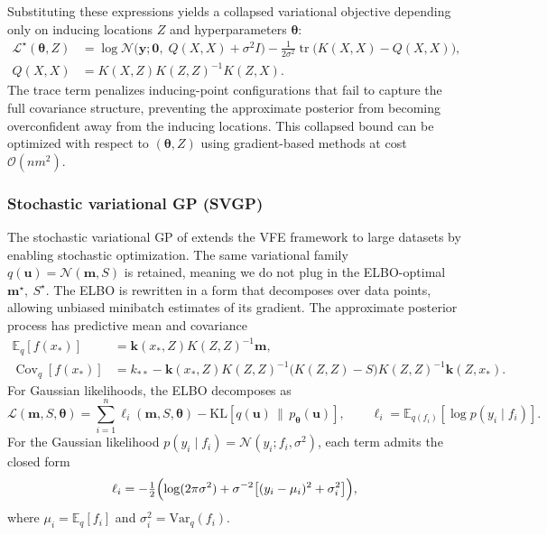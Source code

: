 \documentclass[11pt,a4paper]{article}
\newcommand{\bmm}{\boldsymbol{m}}
\newcommand{\by}{\boldsymbol{y}}
\newcommand{\btheta}{\boldsymbol{\theta}}
\begin{document}
Substituting these expressions yields a collapsed variational objective depending only on inducing locations $Z$ and
hyperparameters $\btheta$:
\begin{equation}
\begin{aligned}
\mathcal{L}^\star(\btheta,Z)
&=\log\mathcal{N}\!\bigl(\by;\bm 0,\;Q(X,X)+\sigma^2 I\bigr)
-\frac{1}{2\sigma^2}\operatorname{tr}\!\bigl(K(X,X)-Q(X,X)\bigr),\\
Q(X,X)&=K(X,Z)K(Z,Z)^{-1}K(Z,X).
\end{aligned}
\label{eq:SVGP elbo}
\end{equation}
The trace term penalizes inducing-point configurations that fail to capture the full covariance structure, preventing the
approximate posterior from becoming overconfident away from the inducing locations.
This collapsed bound can be optimized with respect to $(\btheta,Z)$ using gradient-based methods at cost $\mathcal{O}(nm^2)$.

\subsubsection{Stochastic variational GP (SVGP)}
The stochastic variational GP of \cite{Hensman2013GaussianPF} extends the VFE framework to large datasets by enabling stochastic optimization. The same variational family $q(\boldsymbol{u})=\mathcal{N}(\bmm,S)$ is retained, meaning we do not plug in the ELBO-optimal $\bmm^\star,\ S^\star.$ The ELBO is rewritten in a form that decomposes over data points, allowing unbiased minibatch estimates of its gradient.
The approximate posterior process has predictive mean and covariance
\begin{align*}
\mathbb{E}_q[f(x_\ast)]
&=\boldsymbol{k}(x_\ast,Z)K(Z,Z)^{-1}\bmm,\\
\operatorname{Cov}_q[f(x_\ast)]
&=k_{\ast\ast}-\boldsymbol{k}(x_\ast,Z)K(Z,Z)^{-1}
\bigl(K(Z,Z)-S\bigr)K(Z,Z)^{-1}\boldsymbol{k}(Z,x_\ast).
\end{align*}
For Gaussian likelihoods, the ELBO decomposes as
\begin{equation}\label{eq:ELBO_svgp_sum} \mathcal{L}(\bmm,S,\btheta)=\sum_{i=1}^n \ell_i(\bmm,S,\btheta)-\mathrm{KL}\!\left[q(\boldsymbol{u})\,\|\,p_{\btheta}(\boldsymbol{u})\right], \qquad \ell_i = \mathbb{E}_{q(f_i)}[\log p(y_i\mid f_i)].\end{equation}
For the Gaussian likelihood $p(y_i\mid f_i)=\mathcal{N}(y_i;f_i,\sigma^2)$, each term admits the closed form \begin{displaymath}\ell_i=-\tfrac12\Bigl(\log(2\pi\sigma^2)+\sigma^{-2}\bigl[(y_i-\mu_i)^2 + \sigma_i^2\bigr]\Bigr),\end{displaymath}
where $\mu_i = \mathbb{E}_q[f_i]$ and $\sigma_i^2 = \mathrm{Var}_q(f_i)$.
\end{document}
